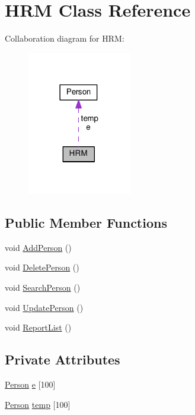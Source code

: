 \hypertarget{classHRM}{}\section{H\+RM Class Reference}
\label{classHRM}


Collaboration diagram for H\+RM\+:
\nopagebreak
\begin{figure}[H]
\begin{center}
\leavevmode
\includegraphics[width=129pt]{classHRM__coll__graph}
\end{center}
\end{figure}
\subsection*{Public Member Functions}
\begin{DoxyCompactItemize}
\item 
void \hyperlink{classHRM_ae6e340e84b8bece41f50eb138f10b6ef}{Add\+Person} ()
\item 
void \hyperlink{classHRM_ad6fd617d1fb2fccb47c7ed93aa9b9d4d}{Delete\+Person} ()
\item 
void \hyperlink{classHRM_af83289bb1e219ccf570122c689a01adc}{Search\+Person} ()
\item 
void \hyperlink{classHRM_a295019723e5d41b3cefe4982afa3f4b4}{Update\+Person} ()
\item 
void \hyperlink{classHRM_ae1fb1f404ad529d8cc690be7b8d8430e}{Report\+List} ()
\end{DoxyCompactItemize}
\subsection*{Private Attributes}
\begin{DoxyCompactItemize}
\item 
\hyperlink{classPerson}{Person} \hyperlink{classHRM_a79ccbda5f455cec5a04d53968f60e6af}{e} \mbox{[}100\mbox{]}
\item 
\hyperlink{classPerson}{Person} \hyperlink{classHRM_a6ddac0a68719ee52ed2328d0c4e6fc8f}{temp} \mbox{[}100\mbox{]}
\end{DoxyCompactItemize}


